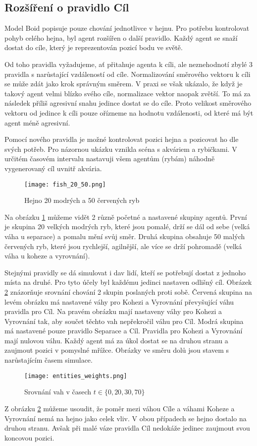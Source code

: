 \subsection{Rozšíření o pravidlo Cíl}
Model Boid popisuje pouze chování jednotlivce v hejnu. Pro potřebu kontrolovat pohyb celého hejna, byl agent rozšířen o další pravidlo. Každý agent se snaží dostat do cíle, který je reprezentován pozicí bodu ve světě. 
\par
Od toho pravidla vyžadujeme, ať přitahuje agenta k cíli, ale neznehodnotí zbylé 3 pravidla s narůstající vzdáleností od cíle. Normalizování směrového vektoru k cíli se může zdát jako krok správným směrem. V praxi se však ukázalo, že když je takový agent velmi blízko svého cíle, normalizace vektor naopak zvětší. To má za následek příliš agresivní snahu jedince dostat se do cíle. Proto velikost směrového vektoru od jedince k cíli pouze ořízneme na hodnotu vzdálenosti, od které má být agent méně agresivní. 
\par
Pomocí nového pravidla je možné kontrolovat pozici hejna a pozicovat ho dle svých potřeb. Pro názornou ukázku vznikla scéna s akváriem a rybičkami. V určitém časovém intervalu nastavuji všem agentům (rybám) náhodně vygenerovaný cíl uvnitř akvária.  
\begin{figure}[H]
	\texttt{[image: fish\_20\_50.png]}
	\centering
	\caption{Hejno 20 modrých a 50 červených ryb}
	\label{fig:ryby2050}
\end{figure}
Na obrázku \ref{fig:ryby2050} můžeme vidět 2 různě početné a nastavené skupiny agentů. První je skupina 20 velkých modrých ryb, které jsou pomalé, drží se dál od sebe (velká váha u separace) a pomalu mění svůj směr. Druhá skupina obsahuje 50 malých červených ryb, které jsou rychlejší, agilnější, ale více se drží pohromadě (velká váha u koheze a vyrovnání). 
\par
Stejnými pravidly se dá simulovat i dav lidí, kteří se potřebují dostat z jednoho místa na druhé. Pro tyto účely byl každému jedinci nastaven odlišný cíl. Obrázek \ref{fig:srovnaniVahy} znázorňuje srovnání chování 2 skupin poslaných proti sobě. Červená skupina na levém obrázku má nastavené váhy pro Kohezi a Vyrovnání převyšující váhu pravidla pro Cíl. Na pravém obrázku mají nastaveny váhy pro Kohezi a Vyrovnání tak, aby součet těchto vah nepřekročil váhu pro Cíl. Modrá skupina má nastavené pouze pravidlo Separace a Cíl. Pravidla pro Kohezi a Vyrovnání mají nulovou váhu. Každý agent má za úkol dostat se na druhou stranu a zaujmout pozici v pomyslné mřížce. Obrázky ve směru dolů jsou stavem s narůstajícím časem simulace. 
\begin{figure}[H]
	\texttt{[image: entities\_weights.png]}
	\centering
	\caption{Srovnání vah v časech $t\in\{ 0,20,30,70\} $}
	\label{fig:srovnaniVahy}
\end{figure}
Z obrázku \ref{fig:srovnaniVahy} můžeme usoudit, že poměr mezi váhou Cíle a váhami Koheze a Vyrovnání nemá na hejno jako celek vliv. V obou případech se hejno dostalo na druhou stranu. Avšak při malé váze pravidla Cíl nedokáže jedinec zaujmout svou koncovou pozici.  

